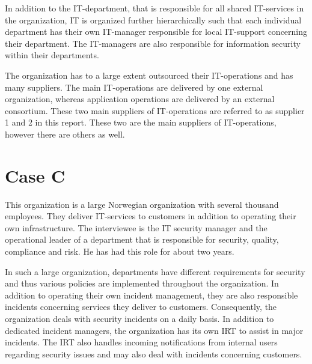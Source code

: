 In addition to the IT-department, that is responsible for all shared IT-services in the organization, IT is organized further hierarchically such that each individual department has their own IT-manager responsible for local IT-support concerning their department. The IT-managers are also responsible for information security within their departments.

The organization has to a large extent outsourced their IT-operations and has    many suppliers. The main IT-operations are delivered by one external organization, whereas application operations are delivered by an external consortium. These two main suppliers of IT-operations are referred to as supplier 1 and 2 in this report. These two are the main suppliers of IT-operations, however there are others as well. 


\section{Case C}
This organization is a large Norwegian organization with several thousand employees. They deliver IT-services to customers in addition to operating their own infrastructure. The interviewee is the IT security manager  and the operational leader of a department that is responsible for security, quality, compliance and risk. He has had this role for about two years.

In such a large organization, departments have different requirements for security and thus various policies are implemented throughout the organization. In addition to operating their own incident management, they are also responsible incidents concerning services they deliver to customers. Consequently, the organization deals with security incidents on a daily basis. In addition to dedicated incident managers, the organization has its own \ac{IRT} to assist in major incidents. The \ac{IRT} also handles incoming notifications from internal users regarding security issues and may also deal with incidents concerning customers. 